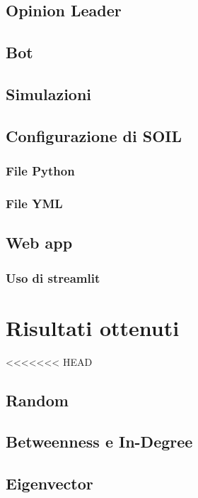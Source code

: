 \documentclass[11pt]{article}
\begin{document}
\subsection{Opinion Leader}

\subsection{Bot}

\subsection{Simulazioni}

\subsection{Configurazione di SOIL}

\subsubsection{File Python}

\subsubsection{File YML}

\subsection{Web app}

\subsubsection{Uso di streamlit}

\section{Risultati ottenuti}

<<<<<<< HEAD
\subsection{Random}


\subsection{Betweenness e In-Degree}

\subsection{Eigenvector}
\end{document}
